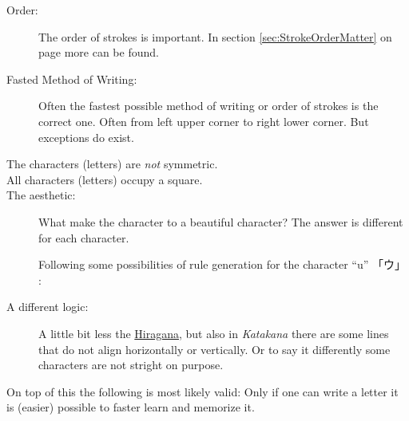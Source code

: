 \begin{description}

\item[Order:] The order of strokes is important. In section
\ref{sec:StrokeOrderMatter} on page \pageref{sec:StrokeOrderMatter} more can be
found. 

\item[Fasted Method of Writing:] Often the fastest possible method of writing
or order of strokes is the correct one.  Often from left upper corner to right
lower corner. But exceptions do exist.

\item[The characters (letters) are \textit{not} symmetric.]

\item[All characters (letters) occupy a square.]

\item[The aesthetic:] What make the character to a beautiful character? The
answer is different for each character.

Following some possibilities of rule generation for the character ``u''
 {「ウ」 }:

\bigskip {}

\bigskip {}


\bigskip {}


\bigskip {}

\bigskip

\item[A different logic:] A little bit less the
\hyperref[sec:Hiragana]{Hiragana}, but also in \textit{Katakana} there are some
lines that do not align horizontally  or vertically. Or to say it differently
some characters are not stright on purpose.

\end{description}

On top of this the following is most likely valid: Only if one can write a
letter it is (easier) possible to faster learn and memorize it.


